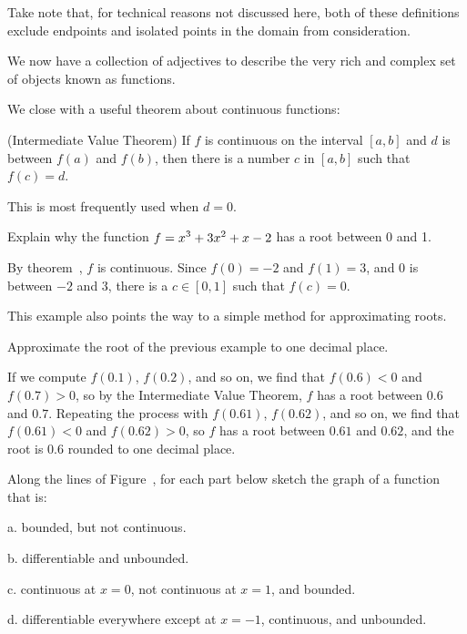 Take note that, for technical reasons not discussed here, both of these
definitions exclude endpoints and isolated points in the domain from
consideration.

We now have a collection of adjectives to describe the very rich and
complex set of objects known as functions.

We close with a useful theorem about continuous functions:

\thm (Intermediate Value Theorem) If $f$ is continuous on the interval
$[a,b]$ and $d$ is between $f(a)$ and $f(b)$, then there is a number
$c$ in $[a,b]$ such that $f(c)=d$. 
\endthmnoproof
{}

This is most frequently used when $d=0$.

\example Explain why the function $\displaystyle f=x^3 + 3x^2+x-2$ has a root between 0
and 1.

By theorem~, $f$ is continuous.
Since $f(0)=-2$ and $f(1)=3$, and $0$ is between $-2$ and $3$, there
is a $c\in[0,1]$ such that $f(c)=0$.
\endexample

This example also points the way to a simple method for approximating
roots. 

\example Approximate the root of the previous example  to one decimal
place.

If we compute $f(0.1)$, $f(0.2)$, and so on, we find that 
$f(0.6)<0$ and $f(0.7)>0$, so by the Intermediate Value Theorem, $f$
has a root between $0.6$ and $0.7$. Repeating the process with
$f(0.61)$, $f(0.62)$, and so on, we find that
$f(0.61)<0$ and $f(0.62)>0$, so $f$ has a root between
$0.61$ and $0.62$, and the root is $0.6$ rounded to one decimal place.
\endexample

\exercises

\exercise Along the lines of Figure~,
for each part below sketch the
 graph of a function that is:

\beginlist

  \item{a.} bounded, but not continuous.

  \item{b.} differentiable and unbounded.

  \item{c.} continuous at $x=0$, not continuous at $x=1$, and bounded.

  \item{d.} differentiable everywhere except at $x=-1$, continuous, and unbounded.

